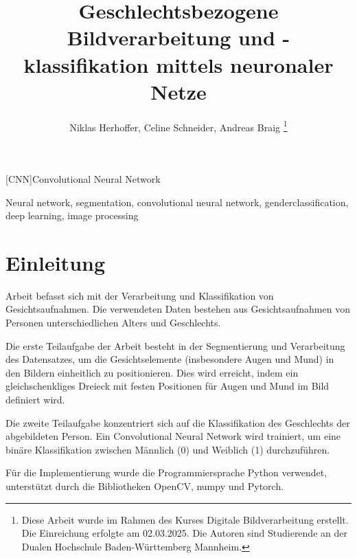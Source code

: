 \documentclass[journal,twoside,web]{ieeecolor}
\begin{document}
\begin{acronym}
    [CNN]{Convolutional Neural Network} 
\end{acronym}

\title{Geschlechtsbezogene Bildverarbeitung und -klassifikation mittels neuronaler Netze} %
\author{Niklas Herhoffer, Celine Schneider, Andreas Braig
\thanks{Diese Arbeit wurde im Rahmen des Kurses Digitale Bildverarbeitung erstellt. Die Einreichung erfolgte am 02.03.2025. Die Autoren sind Studierende an der Dualen Hochschule Baden-Württemberg Mannheim.}
}


\maketitle

    


\begin{IEEEkeywords}
    Neural network, segmentation, convolutional neural network, genderclassification, deep learning, image processing
\end{IEEEkeywords}

\section{Einleitung}
\label{sec:introduction}
 Arbeit befasst sich mit der Verarbeitung und Klassifikation von Gesichtsaufnahmen. Die verwendeten Daten bestehen aus Gesichtsaufnahmen von Personen unterschiedlichen Alters und Geschlechts. 

Die erste Teilaufgabe der Arbeit besteht in der Segmentierung und Verarbeitung des Datensatzes, um die Gesichtselemente (insbesondere Augen und Mund) in den Bildern einheitlich zu positionieren. Dies wird erreicht, indem ein gleichschenkliges Dreieck mit festen Positionen für Augen und Mund im Bild definiert wird. 

Die zweite Teilaufgabe konzentriert sich auf die Klassifikation des Geschlechts der abgebildeten Person. Ein Convolutional Neural Network wird trainiert, um eine binäre Klassifikation zwischen Männlich (0) und Weiblich (1) durchzuführen.

Für die Implementierung wurde die Programmiersprache Python verwendet, unterstützt durch die Bibliotheken OpenCV, numpy und Pytorch.
\end{document}
